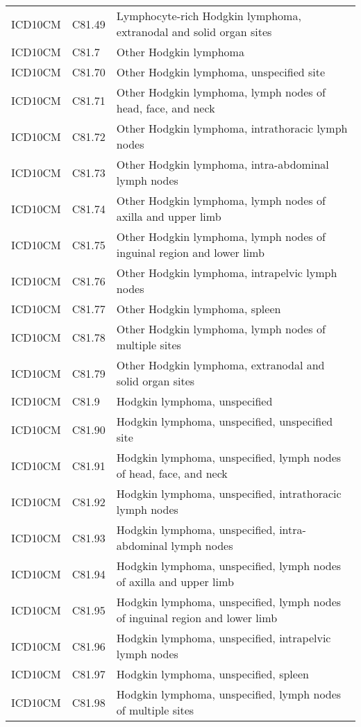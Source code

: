 \begin{longtable}{p{}p{}p{}}
  ICD10CM & C81.49 & Lymphocyte-rich Hodgkin lymphoma, extranodal and solid organ sites \\ 
  ICD10CM & C81.7 & Other Hodgkin lymphoma \\ 
  ICD10CM & C81.70 & Other Hodgkin lymphoma, unspecified site \\ 
  ICD10CM & C81.71 & Other Hodgkin lymphoma, lymph nodes of head, face, and neck \\ 
  ICD10CM & C81.72 & Other Hodgkin lymphoma, intrathoracic lymph nodes \\ 
  ICD10CM & C81.73 & Other Hodgkin lymphoma, intra-abdominal lymph nodes \\ 
  ICD10CM & C81.74 & Other Hodgkin lymphoma, lymph nodes of axilla and upper limb \\ 
  ICD10CM & C81.75 & Other Hodgkin lymphoma, lymph nodes of inguinal region and lower limb \\ 
  ICD10CM & C81.76 & Other Hodgkin lymphoma, intrapelvic lymph nodes \\ 
  ICD10CM & C81.77 & Other Hodgkin lymphoma, spleen \\ 
  ICD10CM & C81.78 & Other Hodgkin lymphoma, lymph nodes of multiple sites \\ 
  ICD10CM & C81.79 & Other Hodgkin lymphoma, extranodal and solid organ sites \\ 
  ICD10CM & C81.9 & Hodgkin lymphoma, unspecified \\ 
  ICD10CM & C81.90 & Hodgkin lymphoma, unspecified, unspecified site \\ 
  ICD10CM & C81.91 & Hodgkin lymphoma, unspecified, lymph nodes of head, face, and neck \\ 
  ICD10CM & C81.92 & Hodgkin lymphoma, unspecified, intrathoracic lymph nodes \\ 
  ICD10CM & C81.93 & Hodgkin lymphoma, unspecified, intra-abdominal lymph nodes \\ 
  ICD10CM & C81.94 & Hodgkin lymphoma, unspecified, lymph nodes of axilla and upper limb \\ 
  ICD10CM & C81.95 & Hodgkin lymphoma, unspecified, lymph nodes of inguinal region and lower limb \\ 
  ICD10CM & C81.96 & Hodgkin lymphoma, unspecified, intrapelvic lymph nodes \\ 
  ICD10CM & C81.97 & Hodgkin lymphoma, unspecified, spleen \\ 
  ICD10CM & C81.98 & Hodgkin lymphoma, unspecified, lymph nodes of multiple sites \\ 

\end{longtable}
